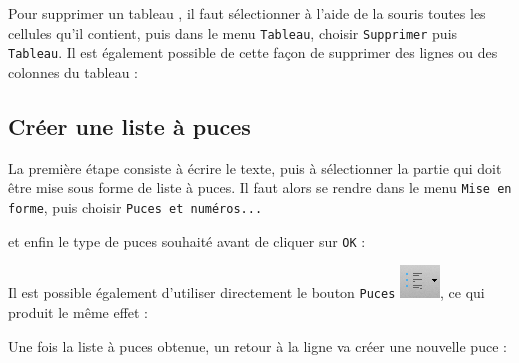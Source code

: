 
 

\vspace{24pt} 

Pour supprimer un tableau , il faut sélectionner à l'aide de la souris toutes les cellules qu'il contient, puis dans le menu \texttt{Tableau}, choisir \texttt{Supprimer} puis \texttt{Tableau}. Il est également possible de cette façon de supprimer des lignes ou des colonnes du tableau :








\subsection{Créer une liste à puces}\label{Texte2ListePuce} 

La première étape consiste à écrire le texte, puis à sélectionner la partie qui doit être mise sous forme de liste à puces. Il faut alors se rendre dans le menu \texttt{Mise en forme}, puis choisir \texttt{Puces et numéros...}       


et enfin le type de puces souhaité avant de cliquer sur \texttt{OK} :


Il est possible également d'utiliser directement le bouton \texttt{Puces} \includegraphics[width=.6cm]{./images/texte02/listePucesIcone}, ce qui produit le même effet :


Une fois la liste à puces obtenue, un retour à la ligne va créer une nouvelle puce :



